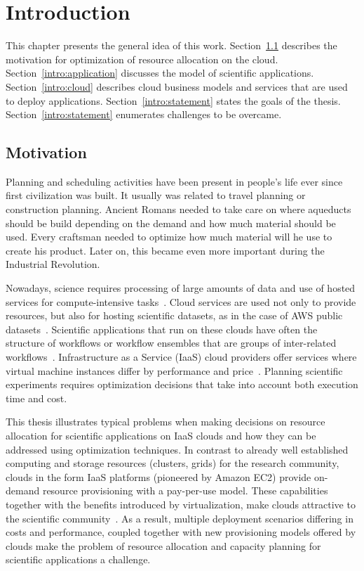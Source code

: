 \chapter{Introduction}
\label{chap:introduction} 

This chapter presents the general idea of this work. Section~\ref{intro:motivation} describes the motivation for optimization of resource allocation on the cloud. Section~\ref{intro:application} discusses the model of scientific applications. Section~\ref{intro:cloud} describes cloud business models and services that are used to deploy applications. Section~\ref{intro:statement} states the goals of the thesis. Section~\ref{intro:statement} enumerates challenges to be overcame. 

\section{Motivation}
\label{intro:motivation}

Planning and scheduling activities have been present in people's life ever since first civilization was built. It usually was related to travel planning or construction planning. Ancient Romans needed to take care on where aqueducts should be build depending on the demand and how much material should be used. Every craftsman needed to optimize how much material will he use to create his product. Later on, this became even more important during the Industrial Revolution.

Nowadays, science requires processing of large amounts of data and use of hosted services for compute-intensive tasks~\cite{Deelman-PPL13}. Cloud services are used not only to provide resources, but also for hosting scientific datasets, as in the case of AWS public datasets~\cite{AWS-public-dataset}. Scientific applications that run on these clouds have often the structure of workflows or workflow ensembles that are groups of inter-related workflows~\cite{Malawski-SC12}. Infrastructure as a Service (IaaS) cloud providers offer services where virtual machine instances differ by performance and price~\cite{Bubak-CCGrid13}. Planning scientific experiments requires optimization decisions that take into account both execution time and cost.

This thesis illustrates typical problems when making decisions on resource allocation for scientific applications on IaaS clouds and how they can be addressed using optimization techniques. In contrast to already well established computing and storage resources (clusters, grids) for the research community, clouds in the form IaaS  platforms (pioneered by Amazon EC2) provide on-demand resource provisioning with a pay-per-use model. These capabilities together with the benefits introduced by virtualization, make clouds attractive to the scientific community~\cite{Deelman09}. As a result, multiple deployment scenarios differing in costs and performance, coupled together with new provisioning models offered by clouds make the problem of resource allocation and capacity planning for scientific applications a challenge.

